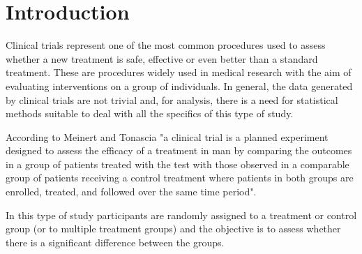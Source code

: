 \documentclass[AMA,STIX1COL]{WileyNJD-v2}
\begin{document}


\maketitle



\section{Introduction}\label{sec1}


Clinical trials represent one of the most common procedures used to assess whether a new treatment is safe, effective or even better than a standard treatment. These are procedures widely used in medical research with the aim of evaluating interventions on a group of individuals. In general, the data generated by clinical trials are not trivial and, for analysis, there is a need for statistical methods suitable to deal with all the specifics of this type of study.

According to Meinert and Tonascia \cite{meinert1986clinical} "a clinical trial is a planned experiment designed to assess the efficacy of a treatment in man by comparing the outcomes in a group of patients treated with the test with those observed in a comparable group of patients receiving a control treatment where patients in both groups are enrolled, treated, and followed over the same time period".

In this type of study participants are randomly assigned to a treatment or control group (or to multiple treatment groups) \cite{hannan2008randomized} and the objective is to assess whether there is a significant difference between the groups.

\end{document}
